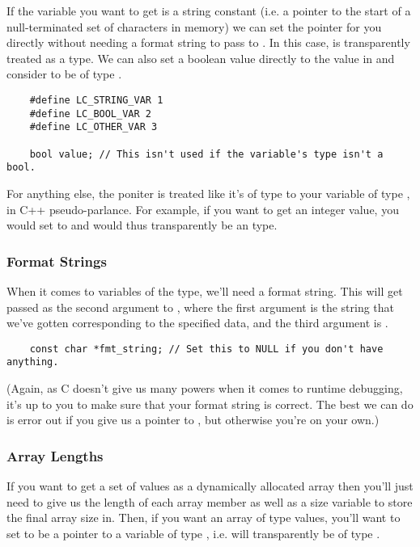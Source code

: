 If the variable you want to get is a string constant (i.e. a pointer to the start of a null-terminated set of characters in memory) we can set the pointer for you directly without needing a format string to pass to . In this case,  is transparently treated as a  type. We can also set a boolean value directly to the value in  and consider  to be of type .

\begin{verbatim}
	#define LC_STRING_VAR 1
	#define LC_BOOL_VAR 2
	#define LC_OTHER_VAR 3

	bool value; // This isn't used if the variable's type isn't a bool.
\end{verbatim}

For anything else, the poniter is treated like it's of type  to your variable of type , in C++ pseudo-parlance. For example, if you want to get an integer value, you would set  to  and  would thus transparently be an  type.

\subsubsection{Format Strings}

When it comes to variables of the  type, we'll need a format string. This will get passed as the second argument to , where the first argument is the string that we've gotten corresponding to the specified data, and the third argument is . 

\begin{verbatim}
	const char *fmt_string; // Set this to NULL if you don't have anything.
\end{verbatim}

(Again, as C doesn't give us many powers when it comes to runtime debugging, it's up to you to make sure that your format string is correct. The best we can do is error out if you give us a pointer to , but otherwise you're on your own.)

\subsubsection{Array Lengths}
\label{sec:arr-discussion}

If you want to get a set of values as a dynamically allocated array then you'll just need to give us the length of each array member as well as a size variable to store the final array size in. Then, if you want an array of type  values, you'll want to set  to be a pointer to a variable of type , i.e.  will transparently be of type .

